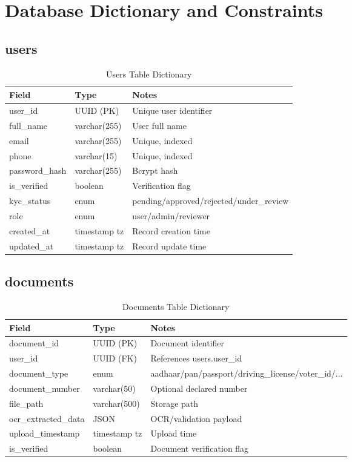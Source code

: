 \chapter{Database Dictionary and Constraints}
\label{app:db-dictionary}

\section{users}
\begin{longtable}{p{3.4cm}p{3.0cm}p{7.0cm}}
\caption{Users Table Dictionary}\\
\toprule
Field & Type & Notes \\
\midrule
user\_id & UUID (PK) & Unique user identifier \\
full\_name & varchar(255) & User full name \\
email & varchar(255) & Unique, indexed \\
phone & varchar(15) & Unique, indexed \\
password\_hash & varchar(255) & Bcrypt hash \\
is\_verified & boolean & Verification flag \\
kyc\_status & enum & pending/approved/rejected/under\_review \\
role & enum & user/admin/reviewer \\
created\_at & timestamp tz & Record creation time \\
updated\_at & timestamp tz & Record update time \\
\bottomrule
\end{longtable}

\section{documents}
\begin{longtable}{p{3.4cm}p{3.0cm}p{7.0cm}}
\caption{Documents Table Dictionary}\\
\toprule
Field & Type & Notes \\
\midrule
document\_id & UUID (PK) & Document identifier \\
user\_id & UUID (FK) & References users.user\_id \\
document\_type & enum & aadhaar/pan/passport/driving\_license/voter\_id/... \\
document\_number & varchar(50) & Optional declared number \\
file\_path & varchar(500) & Storage path \\
ocr\_extracted\_data & JSON & OCR/validation payload \\
upload\_timestamp & timestamp tz & Upload time \\
is\_verified & boolean & Document verification flag \\
\bottomrule
\end{longtable}

